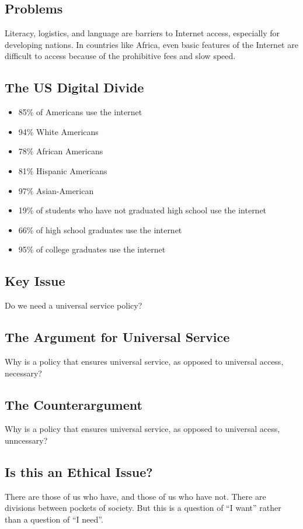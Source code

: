 \documentclass[letterpaper, 12pt]{article}
\begin{document}
\subsection*{Problems}
Literacy, logistics, and language are barriers to Internet access, especially
for developing nations. In countries like Africa, even basic features of the
Internet are difficult to access because of the prohibitive fees and slow
speed.

\subsection*{The US Digital Divide}
\begin{itemize}
  \item 85\% of Americans use the internet
  \item 94\% White Americans
  \item 78\% African Americans
  \item 81\% Hispanic Americans
  \item 97\% Asian-American
  \item 19\% of students who have not graduated high school use the internet
  \item 66\% of high school graduates use the internet
  \item 95\% of college graduates use the internet
\end{itemize}

\subsection*{Key Issue}
Do we need a universal service policy?

\subsection*{The Argument for Universal Service}
Why is a policy that ensures universal service, as opposed to universal access,
necessary?

\subsection*{The Counterargument}
Why is a policy that ensures universal service, as opposed to universal acess,
unncessary?

\subsection*{Is this an Ethical Issue?}
There are those of us who have, and those of us who have not. There are
divisions between pockets of society. But this is a question of ``I want''
rather than a question of ``I need''.
\end{document}
